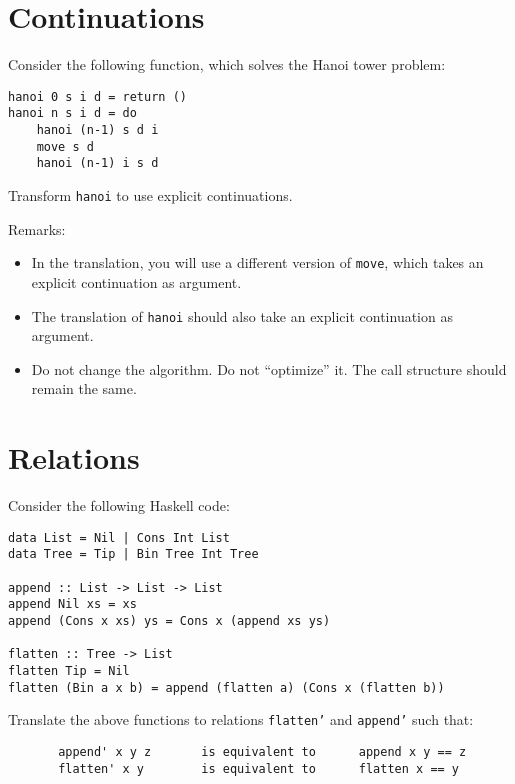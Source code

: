\documentclass{article}
\newcommand{\answer}[1]{}
\begin{document}
\newpage
\section{Continuations}

Consider the following function, which solves the Hanoi tower problem:
\begin{verbatim}
hanoi 0 s i d = return ()
hanoi n s i d = do
    hanoi (n-1) s d i
    move s d 
    hanoi (n-1) i s d 
\end{verbatim}

Transform \texttt{hanoi} to use explicit continuations. 

Remarks: 
\begin{itemize}
\item In the translation, you will use a different version of
  \texttt{move}, which takes an explicit continuation as argument.
\item The translation of \texttt{hanoi} should also take an explicit
  continuation as argument.
\item Do not change the algorithm. Do not ``optimize'' it. The call
  structure should remain the same.
\end{itemize}

\answer{
hanoi 0 s i d k = k ()
hanoi n s i d k = 
    hanoi (n-1) s d i (
    move s d          (
    hanoi (n-1) i s d 
    k))
}

\newpage
\section{Relations}

Consider the following Haskell code:

\begin{verbatim}
data List = Nil | Cons Int List
data Tree = Tip | Bin Tree Int Tree

append :: List -> List -> List
append Nil xs = xs
append (Cons x xs) ys = Cons x (append xs ys)

flatten :: Tree -> List
flatten Tip = Nil
flatten (Bin a x b) = append (flatten a) (Cons x (flatten b))
\end{verbatim}

Translate the above functions to relations \texttt{flatten'} and
\texttt{append'} such that:
\begin{verbatim}
       append' x y z       is equivalent to      append x y == z
       flatten' x y        is equivalent to      flatten x == y
\end{verbatim}
\end{document}
